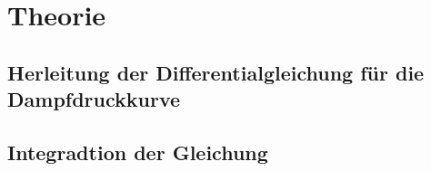 \section{Theorie}
\label{sec:Theorie}
\subsection{Herleitung der Differentialgleichung für die Dampfdruckkurve}

\subsection{Integradtion der Gleichung}